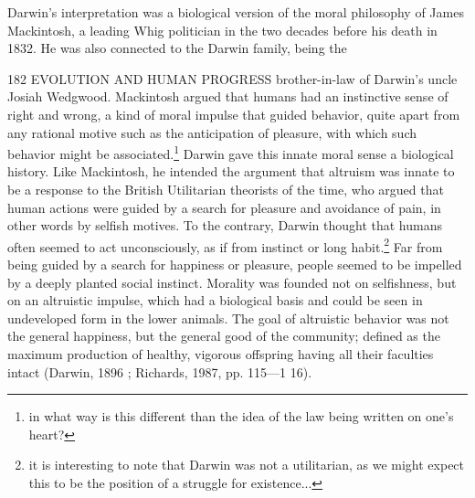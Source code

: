 \documentclass[12pt]{letter}
\begin{document}
Darwin’s interpretation was a biological version of the moral philosophy of James Mackintosh, a leading Whig politician in the two decades before his death in 1832. He was also connected to the Darwin family, being the


182 EVOLUTION AND HUMAN PROGRESS
brother-in-law of Darwin’s uncle Josiah Wedgwood. Mackintosh argued that humans had an instinctive sense of right and wrong, a kind of moral impulse that guided behavior, quite apart from any rational motive such as the anticipation of pleasure, with which such behavior might be associated.\footnote{in what way is this different than the idea of the law being written on one's heart?} Darwin gave this innate moral sense a biological history. Like Mackintosh, he intended the argument that altruism was innate to be a response to the British Utilitarian theorists of the time, who argued that human actions were guided by a search for pleasure and avoidance of pain, in other words by selfish motives. To the contrary, Darwin thought that humans often seemed to act unconsciously, as if from instinct or long habit.\footnote{it is interesting to note that Darwin was not a utilitarian, as we might expect this to be the position of a struggle for existence...} Far from being guided by a search for happiness or pleasure, people seemed to be impelled by a deeply planted social instinct. Morality was founded not on selfishness, but on an altruistic impulse, which had a biological basis and could be seen in undeveloped form in the lower animals. The goal of altruistic behavior was not the general happiness, but the general good of the community; defined as the maximum production of healthy, vigorous offspring having all their faculties intact (Darwin, 1896 ; Richards, 1987, pp. 115—1 16).
\end{document}
